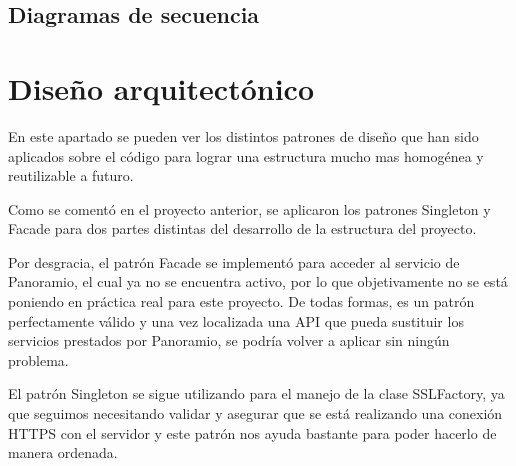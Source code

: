 \subsection{Diagramas de secuencia}

\section{Diseño arquitectónico}

En este apartado se pueden ver los distintos patrones de diseño que han sido aplicados sobre el código para lograr una estructura mucho mas homogénea y reutilizable a futuro.

Como se comentó en el proyecto anterior, se aplicaron los patrones Singleton y Facade para dos partes distintas del desarrollo de la estructura del proyecto.

Por desgracia, el patrón Facade se implementó para acceder al servicio de Panoramio, el cual ya no se encuentra activo, por lo que objetivamente no se está poniendo en práctica real para este proyecto. De todas formas, es un patrón perfectamente válido y una vez localizada una API que pueda sustituir los servicios prestados por Panoramio, se podría volver a aplicar sin ningún problema.

El patrón Singleton se sigue utilizando para el manejo de la clase SSLFactory, ya que seguimos necesitando validar y asegurar que se está realizando una conexión HTTPS con el servidor y este patrón nos ayuda bastante para poder hacerlo de manera ordenada.


